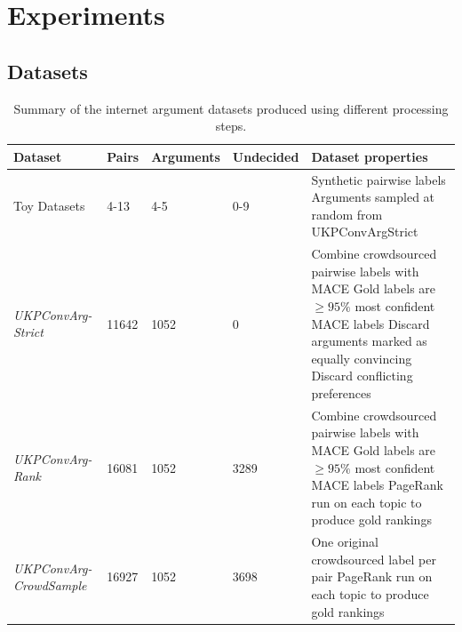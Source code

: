 \section{Experiments}\label{sec:expts}

\subsection{Datasets}
\begin{table}
\small
  \begin{tabularx}{\textwidth}{ p{2.2cm} | p{1cm} p{1.5cm} p{1.6cm} X }
  Dataset & Pairs & Arguments & Undecided & Dataset properties \\\hline\hline
  Toy Datasets & 4-13 & 4-5 & 0-9 & Synthetic pairwise labels
  \newline Arguments sampled at random from UKPConvArgStrict\\  
  \hline\emph{UKPConvArg-Strict} &
  11642 &
  1052 & 
  0 &
  Combine crowdsourced pairwise labels with MACE \newline
  Gold labels are $\ge 95\%$ most confident MACE labels \newline
  Discard arguments marked as equally convincing \newline
  Discard conflicting preferences \\
  \hline\emph{UKPConvArg-Rank} &
  16081 &
  1052 &
  3289 &
  Combine crowdsourced pairwise labels with MACE \newline
  Gold labels are $\ge 95\%$ most confident MACE labels \newline
  PageRank run on each topic to produce gold rankings \\  
  \hline\emph{UKPConvArg-CrowdSample} &
  16927 & 
  1052 &
  3698 &
  One original crowdsourced label per pair\newline
  PageRank run on each topic to produce gold rankings
  \end{tabularx}
  \caption{\label{tab:expt_data} Summary of the internet argument datasets produced using different processing steps.}
\end{table}
